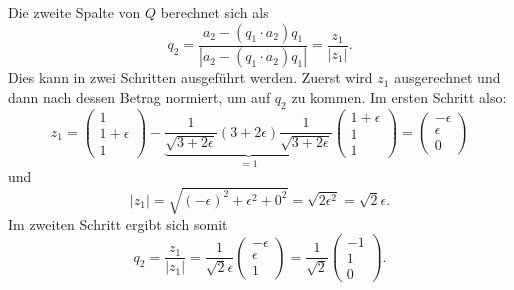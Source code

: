 Die zweite Spalte von $Q$ berechnet sich als
\begin{equation*}
q_2=\frac{a_2-(q_1\cdot a_2)q_1}{|a_2-(q_1\cdot a_2)q_1|}=\frac{z_1}{|z_1|}.
\end{equation*} 
Dies kann in zwei Schritten ausgeführt werden. Zuerst wird $z_1$ ausgerechnet und dann nach dessen Betrag normiert, um auf $q_2$ zu kommen.
Im ersten Schritt also:
\begin{equation*}
z_1=
\begin{pmatrix}
1\\
1+\epsilon\\
1
\end{pmatrix}-\underbrace{\frac{1}{\sqrt{3+2\epsilon}}(3+2\epsilon)\frac{1}{\sqrt{3+2\epsilon}}}_{\displaystyle=1}
\begin{pmatrix}
1+\epsilon\\
1\\
1
\end{pmatrix}=
\begin{pmatrix}
-\epsilon\\
\epsilon\\
0
\end{pmatrix}
\end{equation*}
und
\begin{equation*}
|z_1|=\sqrt{(-\epsilon)^2+\epsilon^2+0^2}=\sqrt{2\epsilon^2}=\sqrt{2}\epsilon.
\end{equation*}
Im zweiten Schritt ergibt sich somit
\begin{equation*}
q_2=\frac{z_1}{|z_1|}=\frac{1}{\sqrt{2}\epsilon}
\begin{pmatrix}
-\epsilon\\
\epsilon\\
1
\end{pmatrix}=
\frac{1}{\sqrt{2}}
\begin{pmatrix}
-1\\
1\\
0
\end{pmatrix}.
\end{equation*}

